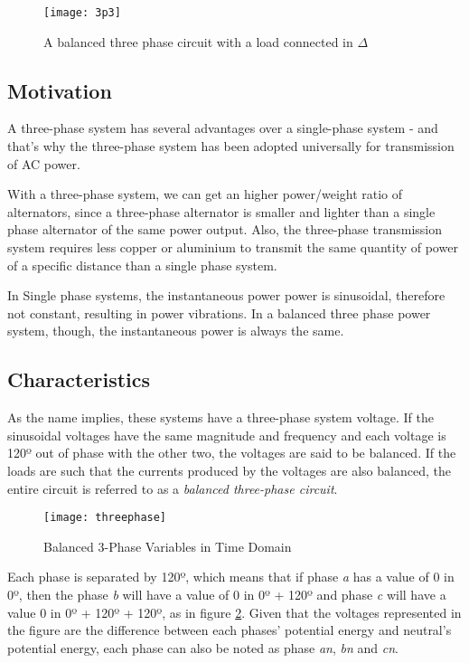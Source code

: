 \begin{figure}[htbp]
	\centering
	\texttt{[image: 3p3]}
	\caption{A balanced three phase circuit with a load connected in $\Delta$}
	\label{fig:balanced_tp_circuit}
\end{figure}

\subsection{Motivation}

A three-phase system has several advantages over a single-phase system - and that's why the three-phase system has been adopted universally for transmission of AC power.

With a three-phase system, we can get an higher power/weight ratio of alternators, since a three-phase alternator is smaller and lighter than a single phase alternator of the same power output. Also, the three-phase transmission system  requires less copper or aluminium to transmit the same quantity of power of a specific distance than a single phase system.

In Single phase systems, the instantaneous power power is sinusoidal, therefore not constant, resulting in power vibrations. In a balanced three phase power system, though, the instantaneous power is always the same.

\subsection{Characteristics}

As the name implies, these systems have a three-phase system voltage. If the sinusoidal voltages have the same magnitude and frequency and each voltage is 120º out of phase with the other two, the voltages are said to be balanced. If the loads are such that the currents produced by the voltages are also balanced, the entire circuit is referred to as a \emph{balanced three-phase circuit}.

\begin{figure}[htbp]
	\centering
	\texttt{[image: threephase]}
	\caption{Balanced 3-Phase Variables in Time Domain}
	\label{fig:balanced_tp_time_domain}
\end{figure}

Each phase is separated by 120º, which means that if phase \emph{a} has a value of 0 in 0º, then the phase \emph{b} will have a value of 0 in 0º + 120º and phase \emph{c} will have a value 0 in 0º + 120º + 120º, as in figure \ref{fig:balanced_tp_time_domain}. Given that the voltages represented in the figure are the difference between each phases' potential energy and neutral's potential energy, each phase can also be noted as phase \emph{an}, \emph{bn} and \emph{cn}.


